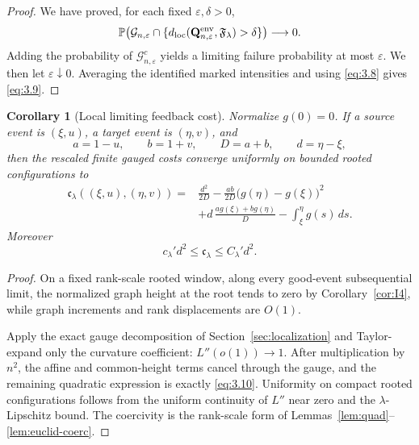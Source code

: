 \documentclass[11pt,reqno]{amsart}
\newtheorem{corollary}[theorem]{Corollary}
\theoremstyle{definition}
\theoremstyle{remark}
\numberwithin{equation}{section}
\newcommand{\Pp}{\mathbb P}
\newcommand{\cF}{\mathfrak F}
\begin{document}
\begin{proof}
We have proved, for each fixed \(\varepsilon,\delta>0\),
\begin{equation}
\Pp\bigl(\mathcal G_{n,\varepsilon}\cap
 \{d_{\rm loc}(\mathbf Q_{n,\varepsilon}^{\rm env},\cF_\lambda)>\delta\}\bigr)
 \longrightarrow0.
\label{eq:3.9a}
\end{equation}
Adding the probability of \(\mathcal G_{n,\varepsilon}^c\) yields a limiting failure
probability at most \(\varepsilon\).  We then let
\(\varepsilon\downarrow0\).  Averaging the identified marked
intensities and using \eqref{eq:3.8} gives \eqref{eq:3.9}.
\end{proof}

\begin{corollary}[Local limiting feedback cost]
\label{cor:limit-cost}
Normalize \(g(0)=0\).  If a source event is \((\xi,u)\), a target event
is \((\eta,v)\), and
\[
a=1-u,\qquad b=1+v,\qquad D=a+b,\qquad d=\eta-\xi,
\]
then the rescaled finite gauged costs converge uniformly on bounded
rooted configurations to
\begin{equation}
\boxed{
\begin{aligned}
\mathfrak c_\lambda((\xi,u),(\eta,v))
={}&
\frac{d^2}{2D}
-\frac{ab}{2D}\bigl(g(\eta)-g(\xi)\bigr)^2\\
&+
d\,\frac{ag(\xi)+bg(\eta)}D
-\int_\xi^\eta g(s)\,ds .
\end{aligned}}
\label{eq:3.10}
\end{equation}
Moreover
\begin{equation}
c_\lambda' d^2\le \mathfrak c_\lambda\le C_\lambda' d^2.
\label{eq:3.11}
\end{equation}
\end{corollary}

\begin{proof}
On a fixed rank-scale rooted window,
along every good-event subsequential limit, the normalized graph height at the root
tends to zero by Corollary~\ref{cor:I4},
while graph increments and rank displacements are \(O(1)\).

Apply the exact gauge decomposition of Section~\ref{sec:localization} and Taylor-expand only
the curvature coefficient:
\(L''(o(1))\to1\).
After multiplication by \(n^2\), the affine and common-height terms
cancel through the gauge, and the remaining quadratic expression is
exactly \eqref{eq:3.10}.  Uniformity on compact rooted configurations follows from
the uniform continuity of \(L''\) near zero and the \(\lambda\)-Lipschitz
bound.  The coercivity is the rank-scale form of
Lemmas~\ref{lem:quad}--\ref{lem:euclid-coerc}.
\end{proof}
\end{document}
